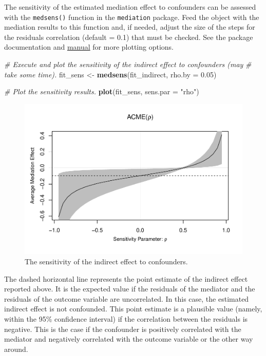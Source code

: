 \documentclass[doc,floatsintext]{apa6}
\newenvironment{Shaded}{\begin{snugshade}}{\end{snugshade}}
\newcommand{\KeywordTok}[1]{\textcolor[rgb]{0.13,0.29,0.53}{\textbf{#1}}}
\newcommand{\DataTypeTok}[1]{\textcolor[rgb]{0.13,0.29,0.53}{#1}}
\newcommand{\FloatTok}[1]{\textcolor[rgb]{0.00,0.00,0.81}{#1}}
\newcommand{\StringTok}[1]{\textcolor[rgb]{0.31,0.60,0.02}{#1}}
\newcommand{\CommentTok}[1]{\textcolor[rgb]{0.56,0.35,0.01}{\textit{#1}}}
\newcommand{\NormalTok}[1]{#1}
\begin{document}
The sensitivity of the estimated mediation effect to confounders can be
assessed with the \texttt{medsens()} function in the \texttt{mediation}
package. Feed the object with the mediation results to this function
and, if needed, adjust the size of the steps for the residuals
correlation (default = 0.1) that must be checked. See the package
documentation and
\href{https://web.mit.edu/teppei/www/research/mediationR.pdf}{manual}
for more plotting options.

\begin{Shaded}
\begin{Highlighting}[]
\CommentTok{# Execute and plot the sensitivity of the indirect effect to confounders (may}
\CommentTok{# take some time).}
\NormalTok{fit_sens <-}\StringTok{ }\KeywordTok{medsens}\NormalTok{(fit_indirect, }\DataTypeTok{rho.by =} \FloatTok{0.05}\NormalTok{)}

\CommentTok{# Plot the sensitivity results.}
\KeywordTok{plot}\NormalTok{(fit_sens, }\DataTypeTok{sens.par =} \StringTok{"rho"}\NormalTok{)}
\end{Highlighting}
\end{Shaded}

\begin{figure}[H]
\centering
\includegraphics[width=12cm]{HelpMyCollaboratorUsesR_files/figure-latex/mediation1sensitivity-1.pdf}
\caption{\label{fig:mediation1sensitivity}The sensitivity of the indirect
effect to confounders.}
\end{figure}

The dashed horizontal line represents the point estimate of the indirect
effect reported above. It is the expected value if the residuals of the
mediator and the residuals of the outcome variable are uncorrelated. In
this case, the estimated indirect effect is not confounded. This point
estimate is a plausible value (namely, within the 95\% confidence
interval) if the correlation between the residuals is negative. This is
the case if the confounder is positively correlated with the mediator
and negatively correlated with the outcome variable or the other way
around.
\end{document}
